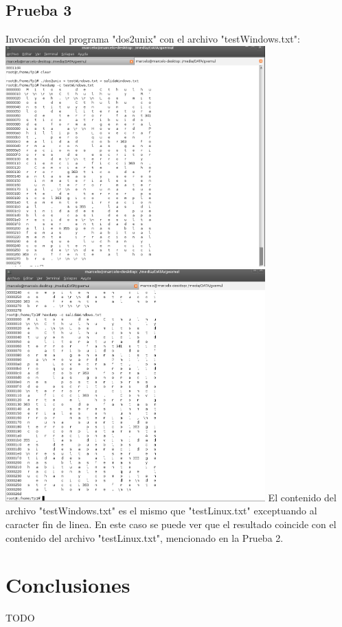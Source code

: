 \documentclass[a4paper,10pt]{article}
\begin{document}
    \subsection{Prueba 3}
    Invocaci\'on del programa "dos2unix" con el archivo "testWindows.txt":
      \newline	
      \includegraphics[width=10cm, viewport=0 0 1018 864]{Imagenes/testWindows.png}
      \newline
      \includegraphics[width=10cm, viewport=0 0 987 882]{Imagenes/salidaWindows.png}
      \newline
	El contenido del archivo "testWindows.txt" es el mismo que "testLinux.txt" exceptuando al caracter fin de linea.
	En este caso se puede ver que el resultado coincide con el contenido del archivo "testLinux.txt", mencionado en la Prueba 2.
      \newline

\newpage
\section{Conclusiones}
  TODO
\end{document}
